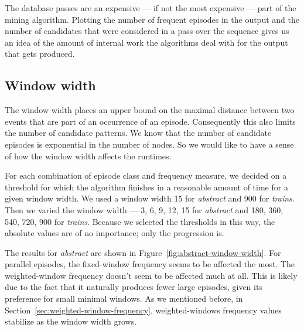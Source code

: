 
The database passes are an expensive --- if not the most expensive --- part of the mining algorithm. Plotting the number of frequent episodes in the output and the number of candidates that were considered in a pass over the sequence gives us an idea of the amount of internal work the algorithms deal with for the output that gets produced.
\fi


\subsection{Window width}

The window width places an upper bound on the maximal distance between two events that are part of an occurrence of an episode. Consequently this also limits the number of candidate patterns. We know that the number of candidate episodes is exponential in the number of nodes. So we would like to have a sense of how the window width affects the runtimes.

For each combination of episode class and frequency measure, we decided on a threshold for which the algorithm finishes in a reasonable amount of time for a given window width. We used a window width 15 for \emph{abstract} and 900 for \emph{trains}. Then we varied the window width --- 3, 6, 9, 12, 15 for \emph{abstract} and 180, 360, 540, 720, 900 for \emph{trains}. Because we selected the thresholds in this way, the absolute values are of no importance; only the progression is.

The results for \emph{abstract} are shown in Figure~\ref{fig:abstract-window-width}. For parallel episodes, the fixed-window frequency seems to be affected the most. The weighted-window frequency doesn't seem to be affected much at all. This is likely due to the fact that it naturally produces fewer large episodes, given its preference for small minimal windows. As we mentioned before, in Section~\ref{sec:weighted-window-frequency}, weighted-windows frequency values stabilize as the window width grows.

